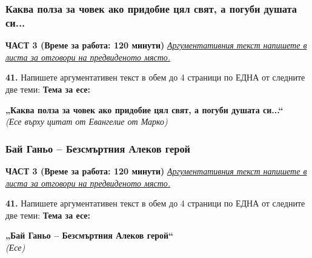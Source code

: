 \documentclass[12pt,a4paper]{article}
\begin{document}
\subsubsection{Каква полза за човек ако придобие цял свят, а погуби душата си...}
\vspace{0.5cm}
\begin{center}
\textbf{ЧАСТ 3 (Време за работа: 120 минути)}
\vspace{0.2cm}
{\textit{\underline{Аргументативния текст напишете в листа за отговори на предвиденото място.}}}
\vspace{0.1cm}
\end{center}
\textbf{41.} Напишете аргументативен текст в обем до 4 страници по ЕДНА от следните две теми:
\vspace{0.2cm}
\textbf{Тема за есе:}
\vspace{0.1cm}
\begin{center}
\textbf{„Каква полза за човек ако придобие цял свят, а погуби душата си...“}
\\
\textit{(Есе върху цитат от Евангелие от Марко)}
\end{center}

\subsubsection{Бай Ганьо – Безсмъртния Алеков герой}
\vspace{0.5cm}
\begin{center}
\textbf{ЧАСТ 3 (Време за работа: 120 минути)}
\vspace{0.2cm}
{\textit{\underline{Аргументативния текст напишете в листа за отговори на предвиденото място.}}}
\vspace{0.1cm}
\end{center}
\textbf{41.} Напишете аргументативен текст в обем до 4 страници по ЕДНА от следните две теми:
\vspace{0.2cm}
\textbf{Тема за есе:}
\vspace{0.1cm}
\begin{center}
\textbf{„Бай Ганьо – Безсмъртния Алеков герой“}
\\
\textit{(Есе)}
\end{center}
\end{document}
